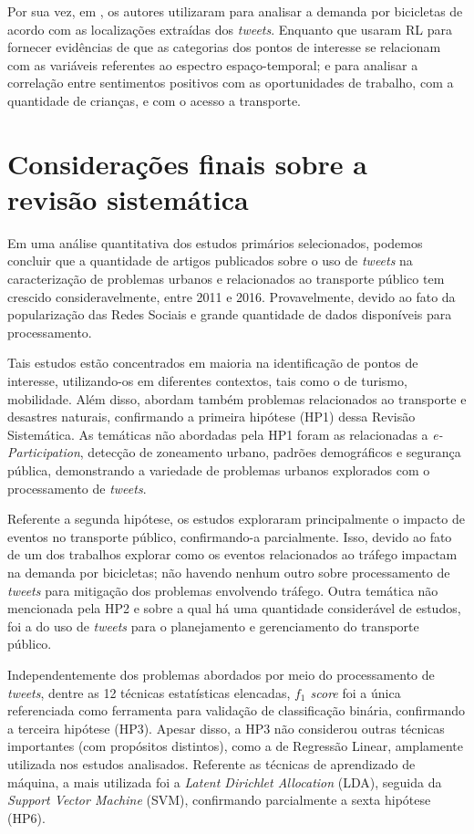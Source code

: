 \documentclass[
	12pt,				%
	oneside,			%
	a4paper,			%
	english,			%
	brazil				%
	]{abntex2ppgsi}
\begin{document}
{{Por sua vez, em \cite{Gutev2016}, os autores utilizaram  para analisar a demanda por bicicletas de acordo com as localizações extraídas dos \textit{tweets}. Enquanto que \cite{Bendler2014} usaram RL para fornecer evidências de que as categorias dos pontos de interesse se relacionam com as variáveis referentes ao espectro espaço-temporal; e \cite{Guo2016} para analisar a correlação entre sentimentos positivos com as oportunidades de trabalho, com a quantidade de crianças, e com o acesso a transporte. 

\section{Considerações finais sobre a revisão sistemática}
\label{conclusao}
Em uma análise quantitativa dos estudos primários selecionados, podemos concluir que a quantidade de artigos publicados sobre o uso de \textit{tweets} na caracterização de problemas urbanos e relacionados ao transporte público tem crescido consideravelmente, entre 2011 e 2016. Provavelmente, devido ao fato da popularização das Redes Sociais e grande quantidade de dados disponíveis para processamento.

Tais estudos estão concentrados em maioria na identificação de pontos de interesse, utilizando-os em diferentes contextos, tais como o de turismo, mobilidade. Além disso, abordam também problemas relacionados ao transporte e desastres naturais, confirmando a primeira hipótese (HP1) dessa Revisão Sistemática. As temáticas não abordadas pela HP1 foram as relacionadas a \textit{e-Participation}, detecção de zoneamento urbano, padrões demográficos e segurança pública, demonstrando a variedade de problemas urbanos explorados com o processamento de \textit{tweets}.

Referente a segunda hipótese, os estudos exploraram principalmente o impacto de eventos no transporte público, confirmando-a parcialmente. Isso, devido ao fato de um dos trabalhos explorar como os eventos relacionados ao tráfego impactam na demanda por bicicletas; não havendo nenhum outro sobre processamento de \textit{tweets} para mitigação dos problemas envolvendo tráfego. Outra temática não mencionada pela HP2 e sobre a qual há uma quantidade considerável de estudos, foi a do uso de \textit{tweets} para o planejamento e gerenciamento do transporte público.

Independentemente dos problemas abordados por meio do processamento de \textit{tweets}, dentre as 12 técnicas estatísticas elencadas, \textit{${f_1}$ score} foi a única referenciada como ferramenta para validação de classificação binária, confirmando a terceira hipótese (HP3). Apesar disso, a HP3 não considerou outras técnicas importantes (com propósitos distintos), como a de Regressão Linear, amplamente utilizada nos estudos analisados. Referente as técnicas de aprendizado de máquina, a mais utilizada foi a \textit{Latent Dirichlet Allocation} (LDA), seguida da \textit{Support Vector Machine} (SVM), confirmando parcialmente a sexta hipótese (HP6).

}}
\end{document}
